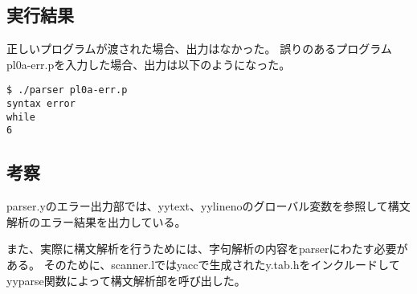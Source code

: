 \subsection{実行結果}
正しいプログラムが渡された場合、出力はなかった。
誤りのあるプログラムpl0a-err.pを入力した場合、出力は以下のようになった。
\begin{lstlisting}[caption={pl0a-err.pの出力},label={pl0a-err.pの出力}]
$ ./parser pl0a-err.p
syntax error
while
6
\end{lstlisting}

\subsection{考察}
parser.yのエラー出力部では、yytext、yylinenoのグローバル変数を参照して構文解析のエラー結果を出力している。

また、実際に構文解析を行うためには、字句解析の内容をparserにわたす必要がある。
そのために、scanner.lではyaccで生成されたy.tab.hをインクルードしてyyparse関数によって構文解析部を呼び出した。
